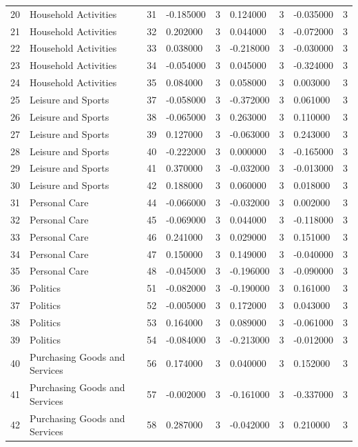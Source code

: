 \begin{tabular}{lllllllll}
20 & Household Activities & 31 & -0.185000 & 3 & 0.124000 & 3 & -0.035000 & 3 \\
21 & Household Activities & 32 & 0.202000 & 3 & 0.044000 & 3 & -0.072000 & 3 \\
22 & Household Activities & 33 & 0.038000 & 3 & -0.218000 & 3 & -0.030000 & 3 \\
23 & Household Activities & 34 & -0.054000 & 3 & 0.045000 & 3 & -0.324000 & 3 \\
24 & Household Activities & 35 & 0.084000 & 3 & 0.058000 & 3 & 0.003000 & 3 \\
25 & Leisure and Sports & 37 & -0.058000 & 3 & -0.372000 & 3 & 0.061000 & 3 \\
26 & Leisure and Sports & 38 & -0.065000 & 3 & 0.263000 & 3 & 0.110000 & 3 \\
27 & Leisure and Sports & 39 & 0.127000 & 3 & -0.063000 & 3 & 0.243000 & 3 \\
28 & Leisure and Sports & 40 & -0.222000 & 3 & 0.000000 & 3 & -0.165000 & 3 \\
29 & Leisure and Sports & 41 & 0.370000 & 3 & -0.032000 & 3 & -0.013000 & 3 \\
30 & Leisure and Sports & 42 & 0.188000 & 3 & 0.060000 & 3 & 0.018000 & 3 \\
31 & Personal Care & 44 & -0.066000 & 3 & -0.032000 & 3 & 0.002000 & 3 \\
32 & Personal Care & 45 & -0.069000 & 3 & 0.044000 & 3 & -0.118000 & 3 \\
33 & Personal Care & 46 & 0.241000 & 3 & 0.029000 & 3 & 0.151000 & 3 \\
34 & Personal Care & 47 & 0.150000 & 3 & 0.149000 & 3 & -0.040000 & 3 \\
35 & Personal Care & 48 & -0.045000 & 3 & -0.196000 & 3 & -0.090000 & 3 \\
36 & Politics & 51 & -0.082000 & 3 & -0.190000 & 3 & 0.161000 & 3 \\
37 & Politics & 52 & -0.005000 & 3 & 0.172000 & 3 & 0.043000 & 3 \\
38 & Politics & 53 & 0.164000 & 3 & 0.089000 & 3 & -0.061000 & 3 \\
39 & Politics & 54 & -0.084000 & 3 & -0.213000 & 3 & -0.012000 & 3 \\
40 & Purchasing Goods and Services & 56 & 0.174000 & 3 & 0.040000 & 3 & 0.152000 & 3 \\
41 & Purchasing Goods and Services & 57 & -0.002000 & 3 & -0.161000 & 3 & -0.337000 & 3 \\
42 & Purchasing Goods and Services & 58 & 0.287000 & 3 & -0.042000 & 3 & 0.210000 & 3 \\

\end{tabular}
